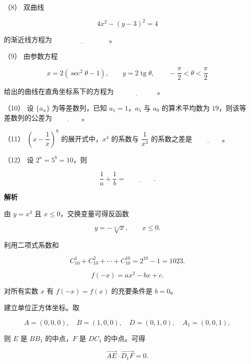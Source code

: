 \begin{answer}
（8） 双曲线

\nopagebreak[4]
\[
4x^2-(y-3)^2=4
\]

的渐近线方程为 $\underline{\hspace{8em}}$。

（9） 由参数方程

\nopagebreak[4]
\[
x=2(\sec^2\theta-1),\qquad y=2\operatorname{tg}\theta,
\qquad -\frac\pi2<\theta<\frac\pi2
\]

给出的曲线在直角坐标系下的方程为 $\underline{\hspace{6em}}$。

（10） 设 $\{a_n\}$ 为等差数列，已知 $a_1=1$，$a_5$ 与 $a_9$ 的算术平均数为 $19$，则该等差数列的公差为 $\underline{\hspace{4em}}$。

（11） $\left(x-\dfrac1x\right)^8$ 的展开式中，$x^4$ 的系数与 $\dfrac1{x^4}$ 的系数之差是 $\underline{\hspace{4em}}$。

（12） 设 $2^a=5^b=10$，则

\nopagebreak[4]
\[
\frac1a+\frac1b=\underline{\hspace{4em}}.
\]

\textbf{解析}


由 $y=x^3$ 且 $x\le0$，交换变量可得反函数

\nopagebreak[4]
\[
y=-\sqrt[3]{x},\qquad x\le0.
\]


利用二项式系数和

\nopagebreak[4]
\[
C_{10}^{1}+C_{10}^{2}+\cdots+C_{10}^{10}
=2^{10}-1=1023.
\]


\nopagebreak[4]
\[
f(-x)=ax^2-bx+c.
\]

对所有实数 $x$ 有 $f(-x)=f(x)$ 的充要条件是 $b=0$。


建立单位正方体坐标。取

\nopagebreak[4]
\[
A=(0,0,0),\quad B=(1,0,0),\quad
D=(0,1,0),\quad A_1=(0,0,1),
\]

则 $E$ 是 $BB_1$ 的中点，$F$ 是 $DC_1$ 的中点。可得

\nopagebreak[4]
\[
\overrightarrow{AE}\cdot\overrightarrow{D_1F}=0.
\]


\end{answer}
